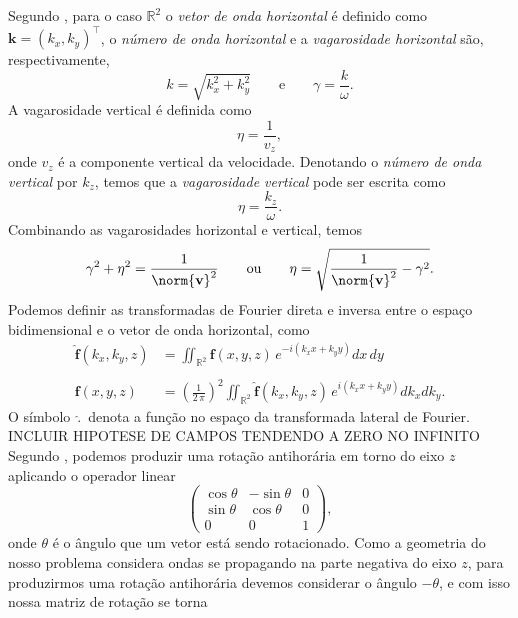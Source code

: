 Segundo \cite{White_Zhou_2006}, para o caso $\mathbb{R}^2$ o \textit{vetor de onda horizontal} \'e definido como $\mathbf{k}=(k_x,k_y)^\top$, o \textit{n\'umero de onda horizontal} e a \textit{vagarosidade horizontal} s\~ao, respectivamente,
\begin{equation}
k=\sqrt{k_x^2+k_y^2}\qquad\text{e}\qquad\gamma=\frac{k}{\omega}.
\end{equation}
A vagarosidade vertical \'e definida como
\begin{equation}
\eta=\frac{1}{v_z},
\end{equation}
onde $v_z$ \'e a componente vertical da velocidade. Denotando o \textit{n\'umero de onda vertical} por $k_z$, temos que a \textit{vagarosidade vertical} pode ser escrita como
\begin{equation}
\eta=\frac{k_z}{\omega}.
\end{equation}
Combinando as vagarosidades horizontal e vertical, temos
\begin{equation}
\gamma^2+\eta^2=\frac{1}{\norm{\mathbf{v}}^2}\qquad\text{ou}\qquad\eta=\sqrt{\frac{1}{\norm{\mathbf{v}}^2}-\gamma^2}.
\end{equation}
Podemos definir as transformadas de Fourier direta e inversa entre o espa\c{c}o bidimensional e o vetor de onda horizontal, como
\begin{align}\label{eq.trans_fourier_1}
\mathbf{\widehat{f}}(k_x,k_y,z) &= \iint_{\mathbb{R}^2}\mathbf{f}(x,y,z)\,e^{-i(k_xx+k_yy)}dx\,dy\\\nonumber\\\label{eq.trans_fourier_2}
\mathbf{f}(x,y,z) &= \left(\frac{1}{2\,\pi}\right)^2\iint_{\mathbb{R}^2}\mathbf{\widehat{f}}(k_x,k_y,z)\,e^{i(k_xx+k_yy)}dk_xdk_y.
\end{align}
O s\'imbolo $\,\widehat{.}\,$ denota a fun\c{c}\~ao no espa\c{c}o da transformada lateral de Fourier.
INCLUIR HIPOTESE DE CAMPOS TENDENDO A ZERO NO INFINITO
Segundo \cite{lang_1986}, podemos produzir uma rota\c{c}\~ao antihor\'aria em torno do eixo $z$ aplicando o operador linear
\begin{equation*}
\begin{pmatrix}
\cos\theta&-\sin\theta&0\\
\sin\theta&\cos\theta&0\\
0&0&1
\end{pmatrix},
\end{equation*}
onde $\theta$ \'e o \^angulo que um vetor est\'a sendo rotacionado. Como a geometria do nosso problema considera ondas se propagando na parte negativa do eixo $z$, para produzirmos uma rota\c{c}\~ao antihor\'aria devemos considerar o \^angulo $-\theta$, e com isso nossa matriz de rota\c{c}\~ao se torna
